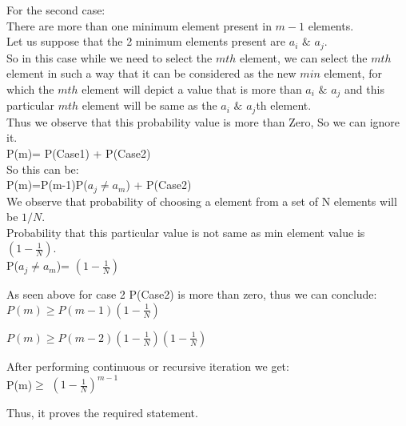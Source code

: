 \documentclass[11pt]{article}
\begin{document}
For the second case:\\
There are more than one minimum element present in $m-1$ elements.\\
Let us suppose that the 2 minimum elements present are $a_{i}$ $\&$ $a_{j}$. \\ So in this case while we need to select the $mth$ element, we can select the $mth$ element in such a way that it can be considered as the new $min$ element, for which the $mth$ element will depict a value that is more than $a_{i}$ $\&$ $a_{j}$ and this particular $mth$ element will be same as the $a_{i}$ $\&$ $a_{j}$th element.\\ Thus we observe that this probability value is more than Zero, So we can ignore it.\\

P(m)= P(Case1) + P(Case2)\\
So this can be:\\
P(m)=P(m-1)P($a_{j}\neq a_{m}$) + P(Case2)\\

We observe that probability of choosing a element from a set of N elements will be $1/N$.\\ 
Probability that this particular value is not same as min element value is $(1-\frac{1}{N})$. \\

P($a_{j}\neq a_{m}$)= $(1-\frac{1}{N})$

As seen above for case 2 P(Case2) is more than zero, thus we can conclude:\\

$P(m)\geq P(m-1)(1-\frac{1}{N})$

$P(m)\geq P(m-2)(1-\frac{1}{N})(1-\frac{1}{N})$

After performing continuous or recursive iteration we get:\\

P(m)$\geq$ $(1-\frac{1}{N})^{m-1}$

Thus, it proves the required statement.
\end{document}

